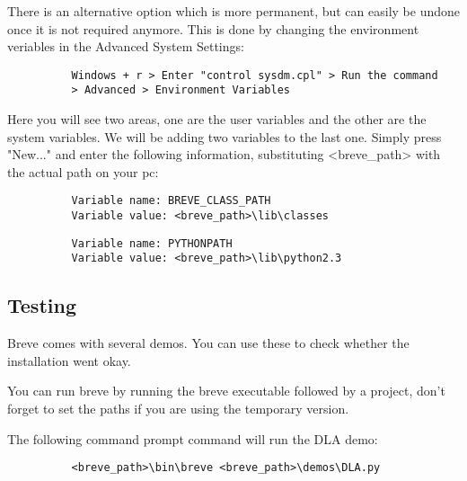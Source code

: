 	There is an alternative option which is more permanent, but can easily be undone once it is not required anymore. This is done by changing the environment veriables in the Advanced System Settings:
	\begin{verbatim}
		  Windows + r > Enter "control sysdm.cpl" > Run the command
		  > Advanced > Environment Variables
	\end{verbatim}

	Here you will see two areas, one are the user variables and the other are the system variables. We will be adding two variables to the last one. Simply press "New..." and enter the following information, substituting <breve\_path> with the actual path on your pc:
	\begin{verbatim}
		  Variable name: BREVE_CLASS_PATH
		  Variable value: <breve_path>\lib\classes
	\end{verbatim}
	\begin{verbatim}
		  Variable name: PYTHONPATH
		  Variable value: <breve_path>\lib\python2.3
	\end{verbatim}

\subsection{Testing}
	Breve comes with several demos. You can use these to check whether the installation went okay. 

	You can run breve by running the breve executable followed by a project, don't forget to set the paths if you are using the temporary version.

	The following command prompt command will run the DLA demo:
	\begin{verbatim}
		  <breve_path>\bin\breve <breve_path>\demos\DLA.py
	\end{verbatim}

